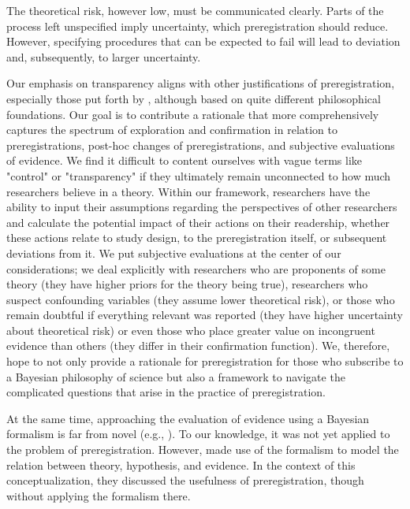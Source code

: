 \documentclass[jou,a4paper]{apa7}
\begin{document}
The theoretical risk, however low, must be communicated clearly.
Parts of the process left unspecified imply uncertainty, which preregistration should reduce.
However, specifying procedures that can be expected to fail will lead to deviation and, subsequently, to larger uncertainty.\par
Our emphasis on transparency aligns with other justifications of preregistration, especially those put forth by \textcite{lakensValuePreregistrationPsychological2019}, although based on quite different philosophical foundations.
Our goal is to contribute a rationale that more comprehensively captures the spectrum of exploration and confirmation in relation to preregistrations, post-hoc changes of preregistrations, and subjective evaluations of evidence.
We find it difficult to content ourselves with vague terms like "control" or "transparency" if they ultimately remain unconnected to how much researchers believe in a theory.
Within our framework, researchers have the ability to input their assumptions regarding the perspectives of other researchers and calculate the potential impact of their actions on their readership, whether these actions relate to study design, to the preregistration itself, or subsequent deviations from it.
We put subjective evaluations at the center of our considerations; we deal explicitly with researchers who are proponents of some theory (they have higher priors for the theory being true), researchers who suspect confounding variables (they assume lower theoretical risk), or those who remain doubtful if everything relevant was reported (they have higher uncertainty about theoretical risk) or even those who place greater value on incongruent evidence than others (they differ in their confirmation function).
We, therefore, hope to not only provide a rationale for preregistration for those who subscribe to a Bayesian philosophy of science but also a framework to navigate the complicated questions that arise in the practice of preregistration.\par
At the same time, approaching the evaluation of evidence using a Bayesian formalism is far from novel (e.g., \cite{kuklaClinicalStatisticalTheory1990,fiedlerWhatConstitutesStrong2017,sprengerBayesianPhilosophyScience2019}).
To our knowledge, it was not yet applied to the problem of preregistration.
However, \textcite{oberauerAddressingTheoryCrisis2019} made use of the formalism to model the relation between theory, hypothesis, and evidence.
In the context of this conceptualization, they discussed the usefulness of preregistration, though without applying the formalism there.
\end{document}
